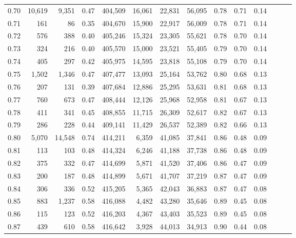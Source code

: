 \begin{tabular}{rrrrrrrrrrrrrr}
0.70 &  10,619 &   9,351 &  0.47 &  404,509 &   16,061 &  22,831 &  56,095 &  0.78 &  0.71 &      0.14 \\
0.71 &     161 &      86 &  0.35 &  404,670 &   15,900 &  22,917 &  56,009 &  0.78 &  0.71 &      0.14 \\
0.72 &     576 &     388 &  0.40 &  405,246 &   15,324 &  23,305 &  55,621 &  0.78 &  0.70 &      0.14 \\
0.73 &     324 &     216 &  0.40 &  405,570 &   15,000 &  23,521 &  55,405 &  0.79 &  0.70 &      0.14 \\
0.74 &     405 &     297 &  0.42 &  405,975 &   14,595 &  23,818 &  55,108 &  0.79 &  0.70 &      0.14 \\
0.75 &   1,502 &   1,346 &  0.47 &  407,477 &   13,093 &  25,164 &  53,762 &  0.80 &  0.68 &      0.13 \\
0.76 &     207 &     131 &  0.39 &  407,684 &   12,886 &  25,295 &  53,631 &  0.81 &  0.68 &      0.13 \\
0.77 &     760 &     673 &  0.47 &  408,444 &   12,126 &  25,968 &  52,958 &  0.81 &  0.67 &      0.13 \\
0.78 &     411 &     341 &  0.45 &  408,855 &   11,715 &  26,309 &  52,617 &  0.82 &  0.67 &      0.13 \\
0.79 &     286 &     228 &  0.44 &  409,141 &   11,429 &  26,537 &  52,389 &  0.82 &  0.66 &      0.13 \\
0.80 &   5,070 &  14,548 &  0.74 &  414,211 &    6,359 &  41,085 &  37,841 &  0.86 &  0.48 &      0.09 \\
0.81 &     113 &     103 &  0.48 &  414,324 &    6,246 &  41,188 &  37,738 &  0.86 &  0.48 &      0.09 \\
0.82 &     375 &     332 &  0.47 &  414,699 &    5,871 &  41,520 &  37,406 &  0.86 &  0.47 &      0.09 \\
0.83 &     200 &     187 &  0.48 &  414,899 &    5,671 &  41,707 &  37,219 &  0.87 &  0.47 &      0.09 \\
0.84 &     306 &     336 &  0.52 &  415,205 &    5,365 &  42,043 &  36,883 &  0.87 &  0.47 &      0.08 \\
0.85 &     883 &   1,237 &  0.58 &  416,088 &    4,482 &  43,280 &  35,646 &  0.89 &  0.45 &      0.08 \\
0.86 &     115 &     123 &  0.52 &  416,203 &    4,367 &  43,403 &  35,523 &  0.89 &  0.45 &      0.08 \\
0.87 &     439 &     610 &  0.58 &  416,642 &    3,928 &  44,013 &  34,913 &  0.90 &  0.44 &      0.08 \\

\end{tabular}
